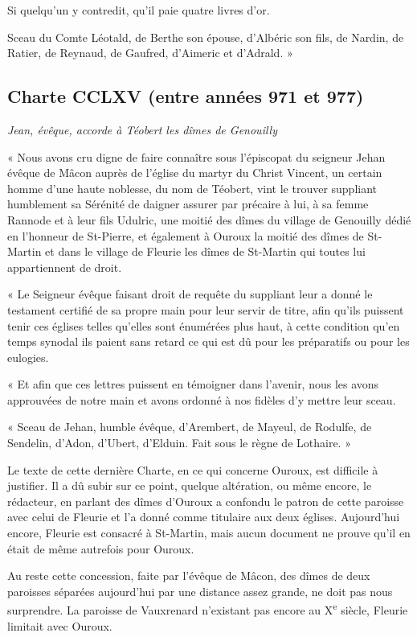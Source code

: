 \documentclass[11pt,a4paper]{report}
\begin{document}
Si quelqu'un y contredit, qu'il paie quatre livres d'or.

Sceau du Comte Léotald, de Berthe son épouse, d'Albéric son fils, de Nardin, de
Ratier, de Reynaud, de Gaufred, d'Aimeric et d'Adrald. »

\subsection*{Charte CCLXV (entre années 971 et 977)}
\textit{Jean, évêque, accorde à Téobert les dîmes de Genouilly}

« Nous avons cru digne de faire connaître sous l'épiscopat du seigneur Jehan
évêque de Mâcon auprès de l'église du martyr du Christ Vincent, un certain homme
d'une haute noblesse, du nom de Téobert, vint le trouver suppliant humblement sa
Sérénité de daigner assurer par précaire à lui, à sa femme Rannode et à leur
fils Udulric, une moitié des dîmes du village de Genouilly dédié en l'honneur de
St-Pierre, et également à Ouroux la moitié des dîmes de St-Martin et dans le
village de Fleurie les dîmes de St-Martin qui toutes lui appartiennent de droit.

« Le Seigneur évêque faisant droit de requête du suppliant leur a donné le
testament certifié de sa propre main pour leur servir de titre, afin qu'ils
puissent tenir ces églises telles qu'elles sont énumérées plus haut, à cette
condition qu'en temps synodal ils paient sans retard ce qui est dû pour les
préparatifs ou pour les eulogies.

« Et afin que ces lettres puissent en témoigner dans l'avenir, nous les avons
approuvées de notre main et avons ordonné à nos fidèles d'y mettre leur sceau.

« Sceau de Jehan, humble évêque, d'Arembert, de Mayeul, de Rodulfe, de Sendelin,
d'Adon, d'Ubert, d'Elduin. Fait sous le règne de Lothaire. »

Le texte de cette dernière Charte, en ce qui concerne Ouroux, est difficile à
justifier. Il a dû subir sur ce point, quelque altération, ou même encore, le
rédacteur, en parlant des dîmes d'Ouroux a confondu le patron de cette paroisse
avec celui de Fleurie et l'a donné comme titulaire aux deux églises. Aujourd'hui
encore, Fleurie est consacré à St-Martin, mais aucun document ne prouve qu'il en
était de même autrefois pour Ouroux.

Au reste cette concession, faite par l'évêque de Mâcon, des dîmes de deux
paroisses séparées aujourd'hui par une distance assez grande, ne doit pas nous
surprendre. La paroisse de Vauxrenard n'existant pas encore au X\textsuperscript{e}
siècle, Fleurie limitait avec Ouroux.
\end{document}
